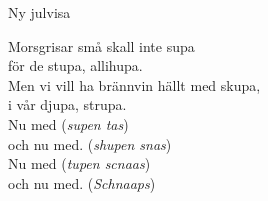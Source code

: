 \begin{song}{Ny julvisa}
	
	
	
	
	Morsgrisar små skall inte supa\\
	för de stupa, allihupa.\\
	Men vi vill ha brännvin hällt med skupa,\\
	i vår djupa, strupa.\\
	Nu med (\emph{supen tas})\\
	och nu med. (\emph{shupen snas})\\
	Nu med (\emph{tupen scnaas})\\
	och nu med. (\emph{Schnaaps})
	
\end{song}
